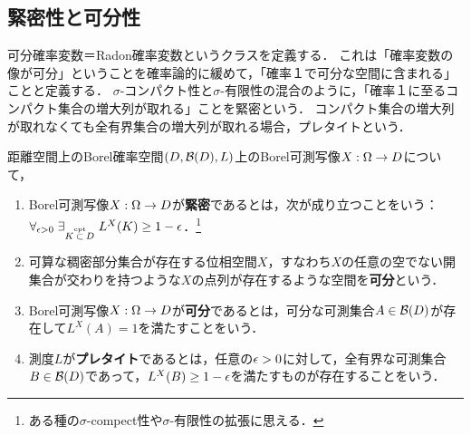 \documentclass[uplatex,dvipdfmx]{jsreport}
\begin{document}
\subsection{緊密性と可分性}

\begin{tcolorbox}[colframe=ForestGreen, colback=ForestGreen!10!white,breakable,colbacktitle=ForestGreen!40!white,coltitle=black,fonttitle=\bfseries\sffamily,
title=可分・緊密な確率変数]
    可分確率変数＝Radon確率変数というクラスを定義する．
    これは「確率変数の像が可分」ということを確率論的に緩めて，「確率１で可分な空間に含まれる」ことと定義する．
    $\sigma$-コンパクト性と$\sigma$-有限性の混合のように，「確率１に至るコンパクト集合の増大列が取れる」ことを緊密という．
    コンパクト集合の増大列が取れなくても全有界集合の増大列が取れる場合，プレタイトという．
\end{tcolorbox}

\begin{definition}
    距離空間上のBorel確率空間$(D,\mathcal{B}(D),L)$上のBorel可測写像$X:\Omega\to D$について，
    \begin{enumerate}
        \item Borel可測写像$X:\Omega\to D$が\textbf{緊密}であるとは，次が成り立つことをいう：$\forall_{\epsilon>0}\;\exists_{K\overset{\textrm{cpt}}{\subset} D}\;L^X(K)\ge 1-\epsilon$．\footnote{ある種の$\sigma$-compect性や$\sigma$-有限性の拡張に思える．}
        \item 可算な稠密部分集合が存在する位相空間$X$，すなわち$X$の任意の空でない開集合が交わりを持つような$X$の点列が存在するような空間を\textbf{可分}という．
        \item Borel可測写像$X:\Omega\to D$が\textbf{可分}であるとは，可分な可測集合$A\in\mathcal{B}(D)$が存在して$L^X(A)=1$を満たすことをいう．
        \item 測度$L$が\textbf{プレタイト}であるとは，任意の$\epsilon>0$に対して，全有界な可測集合$B\in\mathcal{B}(D)$であって，$L^X(B)\ge 1-\epsilon$を満たすものが存在することをいう．
    \end{enumerate}
\end{definition}
\end{document}
